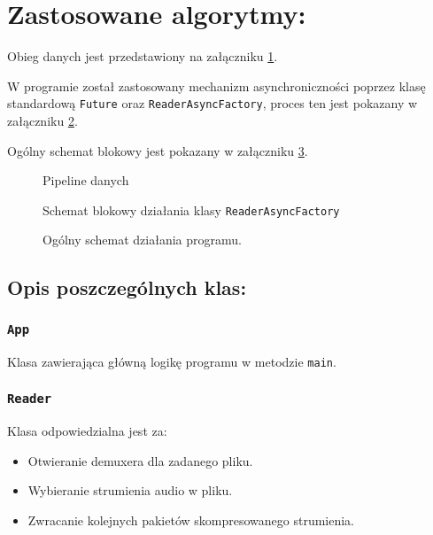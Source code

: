 \documentclass[a4paper,12pt]{article}
\begin{document}
\section{Zastosowane algorytmy:}

Obieg danych jest przedstawiony na załączniku \ref{rys:pipeline}.

W programie został zastosowany mechanizm asynchroniczności poprzez klasę
standardową \texttt{Future} oraz \texttt{ReaderAsyncFactory}, proces ten jest
pokazany w załączniku \ref{rys:reader}. 

Ogólny schemat blokowy jest pokazany w załączniku \ref{rys:program}.

\begin{figure}[p]
    \resizebox{.3\textwidth}{!}{%
    }
    \centering
    \caption{Pipeline danych}
    \label{rys:pipeline}
\end{figure}

\begin{figure}[p]
    \resizebox{.7\textwidth}{!}{%
    }
    \centering
    \caption{Schemat blokowy działania klasy \texttt{ReaderAsyncFactory}}
    \label{rys:reader}
\end{figure}

\begin{figure}[p]
    \resizebox{.54\textwidth}{!}{%
    }
    \centering
    \caption{Ogólny schemat działania programu.}
    \label{rys:program}
\end{figure}

\subsection*{Opis poszczególnych klas:}

\subsubsection{\texttt{App}}

Klasa zawierająca główną logikę programu w metodzie \texttt{main}.

\subsubsection{\texttt{Reader}}

Klasa odpowiedzialna jest za: 
\begin{itemize}
    \item Otwieranie demuxera dla zadanego pliku. 
    \item Wybieranie strumienia audio w pliku.
    \item Zwracanie kolejnych pakietów skompresowanego strumienia.
\end{itemize}
\end{document}
